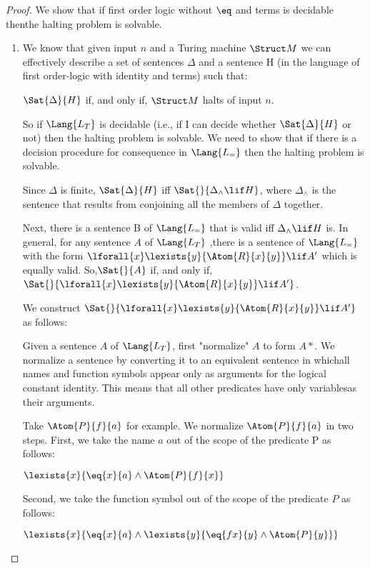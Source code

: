 \documentclass[../../include/open-logic-section]{subfiles}
\begin{document}

\begin{proof}
We show that if first order logic without $\eq$ and terms is decidable
thenthe halting problem is solvable.
\begin{enumerate}
\item We know that given input $n$ and a Turing machine $\Struct M$ we can
effectively describe a set of sentences $\Delta$ and a sentence H (in the
language of first order-logic with identity and terms) such that:

$\Sat{\Delta}{H}$ if, and only if, $\Struct M$ halts of input $n$.

So if $\Lang{L_T}$ is decidable (i.e., if I can decide whether
$\Sat{\Delta}{H}$ or not) then the halting problem is solvable. We need to
show that if there is a decision procedure for consequence in $\Lang{L_=}$
then the halting problem is solvable.

Since $\Delta$ is finite, $\Sat{\Delta}{H}$ iff $\Sat{}{\Delta_\land \lif
H}$, where $\Delta_\land$ is the sentence that results from conjoining all
the members of $\Delta$ together.

Next, there is a sentence B of $\Lang{L_=}$ that is valid iff
$\Delta_\land\lif H$ is. In general, for any sentence $A$ of $\Lang{L_T}$ ,there is a
sentence of $\Lang{L_=}$ with the form
$\lforall{x}\lexists{y}{\Atom{R}{x}{y}}\lif A'$ which is equally valid.
So,$\Sat{}{A}$ if, and only if,
$\Sat{}{\lforall{x}\lexists{y}{\Atom{R}{x}{y}}\lif A'}$.

We construct $\Sat{}{\lforall{x}\lexists{y}{\Atom{R}{x}{y}}\lif A'}$ as
follows:

Given a sentence $A$ of $\Lang{L_T}$, first "normalize" $A$ to form $A*$.
We normalize a sentence by converting it to an equivalent sentence in
whichall names and function symbols appear only as arguments for the
logical
constant identity. This means that all other predicates have only
variablesas their arguments.

Take $\Atom{P}{f}{a}$ for example. We normalize $\Atom{P}{f}{a}$ in two
steps. First, we take the name $a$ out of the scope of the predicate P as
follows:

$\lexists{x}{\eq{x}{a} \land \Atom{P}{f}{x}}$

Second, we take the function symbol out of the scope of the predicate $P$
as follows:

$\lexists{x}{\eq{x}{a} \land \lexists{y}{\eq{fx}{y} \land \Atom{P}{y}}}$


\end{enumerate}
\end{proof}
\end{document}
